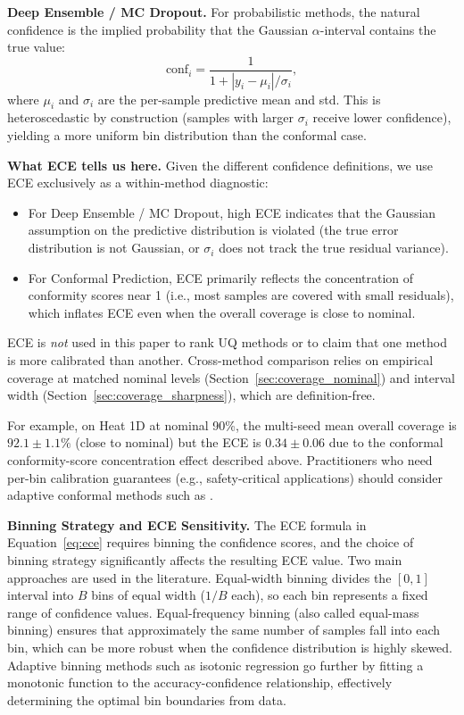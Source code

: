 \documentclass[12pt,a4paper]{article}
\theoremstyle{plain}
\begin{document}
\textbf{Deep Ensemble / MC Dropout.}
For probabilistic methods, the natural confidence is the implied probability
that the Gaussian $\alpha$-interval contains the true value:
\begin{equation}
    \label{eq:conf_ensemble}
    \text{conf}_i = \frac{1}{1 + |y_i - \mu_i|/\sigma_i},
\end{equation}
where $\mu_i$ and $\sigma_i$ are the per-sample predictive mean and std.
This is heteroscedastic by construction (samples with larger $\sigma_i$
receive lower confidence), yielding a more uniform bin distribution than
the conformal case.

\textbf{What ECE tells us here.}
Given the different confidence definitions, we use ECE exclusively as a
within-method diagnostic:
\begin{itemize}
    \item For Deep Ensemble / MC Dropout, high ECE indicates that the
        Gaussian assumption on the predictive distribution is violated
        (the true error distribution is not Gaussian, or $\sigma_i$ does
        not track the true residual variance).
    \item For Conformal Prediction, ECE primarily reflects the
        concentration of conformity scores near 1 (i.e., most samples are
        covered with small residuals), which inflates ECE even when the
        overall coverage is close to nominal.
\end{itemize}
ECE is \emph{not} used in this paper to rank UQ methods or to claim that
one method is more calibrated than another.  Cross-method comparison relies
on empirical coverage at matched nominal levels (Section~\ref{sec:coverage_nominal})
and interval width (Section~\ref{sec:coverage_sharpness}), which are
definition-free.

For example, on Heat 1D at nominal 90\%, the multi-seed mean overall coverage
is $92.1 \pm 1.1\%$ (close to nominal) but the ECE is $0.34 \pm 0.06$
due to the conformal conformity-score concentration effect described above.
Practitioners who need per-bin calibration guarantees (e.g., safety-critical
applications) should consider adaptive conformal methods such as
\citep{romano2020conformalized}.

\textbf{Binning Strategy and ECE Sensitivity.}
The ECE formula in Equation~\ref{eq:ece} requires binning the confidence
scores, and the choice of binning strategy significantly affects the resulting
ECE value. Two main approaches are used in the literature. Equal-width binning
divides the $[0, 1]$ interval into $B$ bins of equal width ($1/B$ each), so
each bin represents a fixed range of confidence values. Equal-frequency binning
(also called equal-mass binning) ensures that approximately the same number
of samples fall into each bin, which can be more robust when the confidence
distribution is highly skewed. Adaptive binning methods such as isotonic
regression go further by fitting a monotonic function to the accuracy-confidence
relationship, effectively determining the optimal bin boundaries from data.
\end{document}
